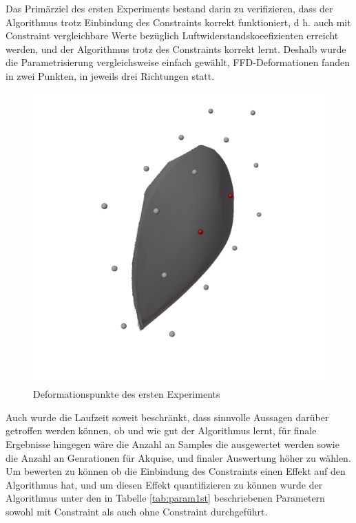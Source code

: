 Das Primärziel des ersten Experiments bestand darin zu verifizieren, dass der Algorithmus trotz Einbindung des Constraints korrekt funktioniert, d h. auch mit Constraint vergleichbare Werte bezüglich Luftwiderstandskoeefizienten erreicht werden, und der Algorithmus trotz des Constraints korrekt lernt.
Deshalb wurde die Parametrisierung vergleichsweise einfach gewählt, FFD-Deformationen fanden in zwei Punkten, in jeweils drei Richtungen statt.
\begin{figure}[h]
	\centering
	\includegraphics[width=.7\linewidth]{bilder/2ptDeformationPoints}
	\caption{Deformationspunkte des ersten Experiments}
	\label{fig:ffd1st}
\end{figure}
Auch wurde die Laufzeit soweit beschränkt, dass sinnvolle Aussagen darüber getroffen werden können, ob und wie gut der Algorithmus lernt, für finale Ergebnisse hingegen wäre die Anzahl an Samples die ausgewertet werden sowie die Anzahl an Genrationen für Akquise, und finaler Auswertung höher zu wählen.
Um bewerten zu können ob die Einbindung des Constraints einen Effekt auf den Algorithmus hat, und um diesen Effekt quantifizieren zu können wurde der Algorithmus unter den in Tabelle \cref{tab:param1st} beschriebenen Parametern sowohl mit Constraint als auch ohne Constraint durchgeführt. 
